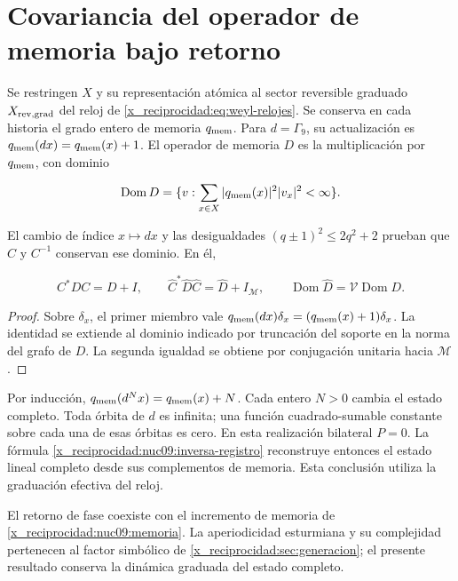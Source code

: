 \section{Covariancia del operador de memoria bajo retorno}

Se restringen \(X\) y su representación atómica al sector reversible
graduado \(X_{\rm rev,grad}\) del reloj de
\eqref{x_reciprocidad:eq:weyl-relojes}. Se conserva en cada historia el grado entero
de memoria \(q_{\rm mem}\). Para \(d=\Gamma_9\), su actualización es
\(q_{\rm mem}(dx)=q_{\rm mem}(x)+1\).
El operador de memoria \(D\) es la multiplicación por
\(q_{\rm mem}\), con dominio



\[
\operatorname{Dom}D=\{v:\sum_{x\in X}|q_{\rm mem}(x)|^2|v_x|^2<\infty\}.
\]



El cambio de índice \(x\mapsto dx\) y las desigualdades
\((q\pm1)^2\le2q^2+2\) prueban que \(C\) y \(C^{-1}\)
conservan ese dominio. En él,



\begin{equation}
C^*DC=D+I,\qquad
\widehat C^*\widehat D\widehat C=\widehat D+I_{\mathcal M},
\qquad\operatorname{Dom}\widehat D=\mathcal V\operatorname{Dom}D.
\label{x_reciprocidad:nuc09:memoria}
\end{equation}



\begin{proof}
Sobre \(\delta_x\), el primer miembro vale
\(q_{\rm mem}(dx)\delta_x=(q_{\rm mem}(x)+1)\delta_x\).
La identidad se extiende al dominio indicado por truncación del
soporte en la norma del grafo de \(D\).
La segunda igualdad se obtiene por conjugación unitaria hacia
\(\mathcal M\).
\end{proof}

Por inducción,
\(q_{\rm mem}(d^Nx)=q_{\rm mem}(x)+N\).
Cada entero \(N>0\) cambia el estado completo.
Toda órbita de \(d\) es infinita; una función cuadrado-sumable
constante sobre cada una de esas órbitas es cero.
En esta realización bilateral \(P=0\).
La fórmula \eqref{x_reciprocidad:nuc09:inversa-registro} reconstruye entonces
el estado lineal completo desde sus complementos de memoria.
Esta conclusión utiliza la graduación efectiva del reloj.

El retorno de fase coexiste con el incremento de memoria de
\eqref{x_reciprocidad:nuc09:memoria}.
La aperiodicidad esturmiana y su complejidad pertenecen al factor
simbólico de \cref{x_reciprocidad:sec:generacion}; el presente resultado conserva
la dinámica graduada del estado completo.

